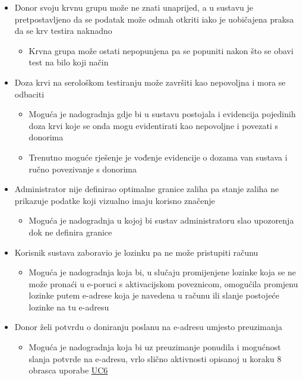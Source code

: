 {\begin{itemize}
                \item Donor svoju krvnu grupu može ne znati unaprijed, a u sustavu je pretpostavljeno da se podatak može odmah otkriti iako je uobičajena praksa da se krv testira naknadno
                \begin{itemize}
                    \item Krvna grupa može ostati nepopunjena pa se popuniti nakon što se obavi test na bilo koji način
                \end{itemize}
                
                \item Doza krvi na serološkom testiranju može završiti kao nepovoljna i mora se odbaciti
                \begin{itemize}
                    \item Moguća je nadogradnja gdje bi u sustavu postojala i evidencija pojedinih doza krvi koje se onda mogu evidentirati kao nepovoljne i povezati s donorima
                    \item Trenutno moguće rješenje je vođenje evidencije o dozama van sustava i ručno povezivanje s donorima
                \end{itemize}
                
                \item Administrator nije definirao optimalne granice zaliha pa stanje zaliha ne prikazuje podatke koji vizualno imaju korisno značenje
                \begin{itemize}
                    \item Moguća je nadogradnja u kojoj bi sustav administratoru slao upozorenja dok ne definira granice
                \end{itemize}
                
                \item Korisnik sustava zaboravio je lozinku pa ne može pristupiti računu
                \begin{itemize}
                    \item Moguća je nadogradnja koja bi, u slučaju promijenjene lozinke koja se ne može pronaći u e-poruci s aktivacijskom poveznicom, omogućila promjenu lozinke putem e-adrese koja je navedena u računu ili slanje postojeće lozinke na tu e-adresu  
                \end{itemize}
                
                \item Donor želi potvrdu o doniranju poslanu na e-adresu umjesto preuzimanja
                \begin{itemize}
                    \item Moguća je nadogradnja koja bi uz preuzimanje ponudila i mogućnost slanja potvrde na e-adresu, vrlo slično aktivnosti opisanoj u koraku 8 obrasca uporabe \hyperref[UC6]{UC6}
                \end{itemize}
                

\end{itemize}}
